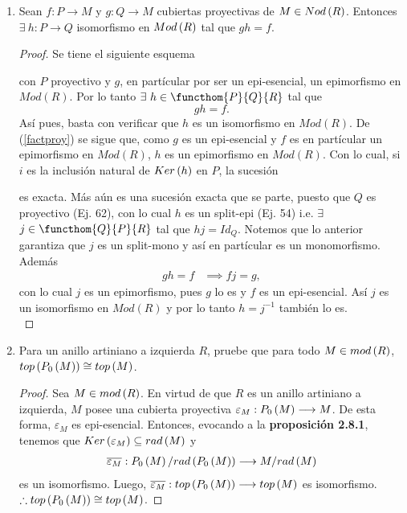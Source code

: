 \documentclass{article}
\begin{document}
\begin{enumerate}[label=\textbf{Ej \arabic*.}]
\item Sean $f:P\to M$ y $g:Q\to M$ 	cubiertas proyectivas de $M\in Nod\left(R\right)$. Entonces $\exists\ h:P\to Q$ isomorfismo en $Mod\left(R\right)$ tal que $gh=f$.
		\begin{proof}
			Se tiene el siguiente esquema
			\begin{center}
			\end{center}
			con $P$ proyectivo y $g$, en partícular por ser un epi-esencial, un epimorfismo en $Mod(R)$. Por lo tanto $\exists\ h\in\functhom{P}{Q}{R}$ tal que \begin{equation*}\tag{*}\label{factproy}
				gh=f.
			\end{equation*} Así pues, basta con verificar que $h$ es un isomorfismo en $Mod(R)$. De (\ref{factproy}) se sigue que, como $g$ es un epi-esencial y $f$ es en  partícular un epimorfismo en $Mod(R)$,  $h$ es un epimorfismo en $Mod(R)$. Con lo cual, si $i$ es la inclusión natural de $Ker\left(h\right)$ en $P$, la sucesión
			\begin{center}
			\end{center}
			es exacta. Más aún es una sucesión exacta que se parte, puesto que $Q$ es proyectivo (Ej. 62), con lo cual $h$ es un split-epi (Ej. 54) i.e. $\exists$ $j\in\functhom{Q}{P}{R}$ tal que $hj=Id_Q$. Notemos que lo anterior garantiza que $j$ es un split-mono y así en partícular es un monomorfismo. Además
			\begin{align*}
				gh=f&\implies fj=g,
			\end{align*}
			con lo cual $j$ es un epimorfismo, pues $g$ lo es y $f$ es un epi-esencial. Así $j$ es un isomorfismo en $Mod(R)$ y por lo tanto $h=j^{-1}$ también lo es.\\
		\end{proof}

		\item Para un anillo artiniano a izquierda $R$, pruebe que para todo $M \in mod\left(R\right)$, $top\left(P_{0}\left(M\right)\right) \cong top\left(M\right)$.
	\begin{proof}
		Sea $M \in mod\left(R\right)$. En virtud de que $R$ es un anillo artiniano a izquierda, $M$ posee una cubierta proyectiva $\varepsilon_{M}:P_{0}\left(M\right)\longrightarrow M$. De esta forma, $\varepsilon_{M}$ es epi-esencial. Entonces, evocando a la \textbf{proposición 2.8.1}, tenemos que $Ker\left(\varepsilon_{M}\right) \subseteq rad\left(M\right)$ y 
		\begin{align*}
			\overline{\varepsilon_{M}}:P_{0}\left(M\right)/rad\left(P_{0}\left(M\right)\right)\longrightarrow M/rad\left(M\right)
		\end{align*}
		es un isomorfismo. Luego, $\overline{\varepsilon_{M}}:top\left(P_{0}\left(M\right)\right)\longrightarrow top\left(M\right)$ es isomorfismo. $\therefore top\left(P_{0}\left(M\right)\right) \cong top \left(M\right)$.
	\end{proof}


\end{enumerate}
\end{document}
